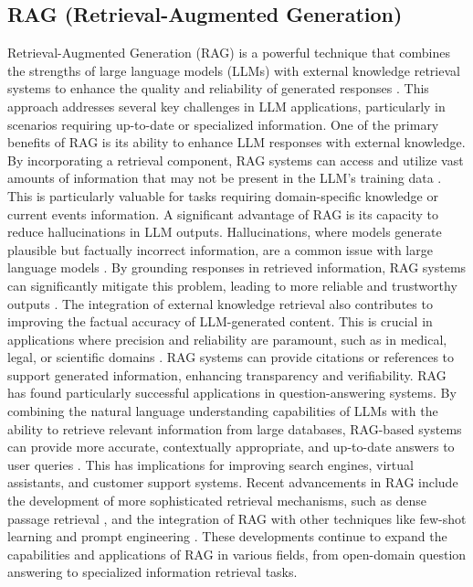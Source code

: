 \documentclass[a4paper, oneside]{discothesis}
\begin{document}
\subsection{RAG (Retrieval-Augmented Generation)}
Retrieval-Augmented Generation (RAG) is a powerful technique that combines the strengths of large language models (LLMs) with external knowledge retrieval systems to enhance the quality and reliability of generated responses \cite{lewis2020retrieval}. This approach addresses several key challenges in LLM applications, particularly in scenarios requiring up-to-date or specialized information.
One of the primary benefits of RAG is its ability to enhance LLM responses with external knowledge. By incorporating a retrieval component, RAG systems can access and utilize vast amounts of information that may not be present in the LLM's training data \cite{lewis2020retrieval}. This is particularly valuable for tasks requiring domain-specific knowledge or current events information.
A significant advantage of RAG is its capacity to reduce hallucinations in LLM outputs. Hallucinations, where models generate plausible but factually incorrect information, are a common issue with large language models \cite{maynez2020faithfulness}. By grounding responses in retrieved information, RAG systems can significantly mitigate this problem, leading to more reliable and trustworthy outputs \cite{lewis2020retrieval}.
The integration of external knowledge retrieval also contributes to improving the factual accuracy of LLM-generated content. This is crucial in applications where precision and reliability are paramount, such as in medical, legal, or scientific domains \cite{karpukhin2020dense}. RAG systems can provide citations or references to support generated information, enhancing transparency and verifiability.
RAG has found particularly successful applications in question-answering systems. By combining the natural language understanding capabilities of LLMs with the ability to retrieve relevant information from large databases, RAG-based systems can provide more accurate, contextually appropriate, and up-to-date answers to user queries \cite{guu2020retrieval}. This has implications for improving search engines, virtual assistants, and customer support systems.
Recent advancements in RAG include the development of more sophisticated retrieval mechanisms, such as dense passage retrieval \cite{karpukhin2020dense}, and the integration of RAG with other techniques like few-shot learning and prompt engineering \cite{liu2021pre}. These developments continue to expand the capabilities and applications of RAG in various fields, from open-domain question answering to specialized information retrieval tasks.
\end{document}
